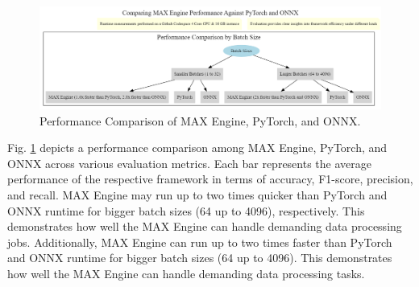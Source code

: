\documentclass[conference]{IEEEtran}
\begin{document}
\begin{figure}[H]
    \centerline{\includegraphics[width=\linewidth]{7.png}}
    \caption{Performance Comparison of MAX Engine, PyTorch, and ONNX.}
    \label{fig7}
\end{figure}

Fig. \ref{fig7} depicts a performance comparison among MAX Engine, PyTorch, and ONNX across various evaluation metrics. Each bar represents the average performance of the respective framework in terms of accuracy, F1-score, precision, and recall.
MAX Engine may run up to two times quicker than PyTorch and ONNX runtime for bigger batch sizes (64 up to 4096), respectively. This demonstrates how well the MAX Engine can handle demanding data processing jobs. Additionally, MAX Engine can run up to two times faster than PyTorch and ONNX runtime for bigger batch sizes (64 up to 4096). 
This demonstrates how well the MAX Engine can handle demanding data processing tasks.
\end{document}
